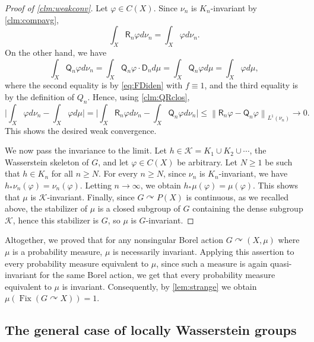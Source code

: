 \documentclass{amsart}
\numberwithin{equation}{subsection}
\theoremstyle{plain}
\theoremstyle{definition}
\theoremstyle{plain}
\begin{document}
\begin{proof}[Proof of \cref{clm:weakconv}]
Let \(\varphi\in C\left(X\right)\). Since \(\nu_{n}\) is \(K_{n}\)-invariant by \cref{clm:compavg},
\[\int_{X}\mathsf{R}_{n}\varphi d\nu_{n}=\int_{X}\varphi d\nu_{n}.\]
On the other hand, we have
\[\int_{X}\mathsf{Q}_{n}\varphi d\nu_{n}=\int_{X}\mathsf{Q}_{n}\varphi\cdot\mathsf{D}_{n}d\mu=\int_{X}\mathsf{Q}_{n}\varphi d\mu=\int_{X}\varphi d\mu,\]
where the second equality is by \eqref{eq:FDiden} with \(f\equiv 1\), and the third equality is by the definition of \(Q_{n}\). Hence, using \cref{clm:QRclos},
\[\Big|\int_{X}\varphi d\nu_{n}-\int_{X}\varphi d\mu\Big|=\Big|\int_{X}\mathsf{R}_{n}\varphi d\nu_{n}-\int_{X}\mathsf{Q}_{n}\varphi d\nu_{n}\Big|\leq\left\|\mathsf{R}_{n}\varphi-\mathsf{Q}_{n}\varphi\right\|_{L^{1}\left(\nu_{n}\right)}\to0.\]
This shows the desired weak convergence.

\smallskip

We now pass the invariance to the limit. Let \(h\in\mathcal{K}=K_{1}\cup K_{2}\cup\dotsm\), the Wasserstein skeleton of \(G\), and let \(\varphi\in C\left(X\right)\) be arbitrary. Let \(N\geq1\) be such that \(h\in K_{n}\) for all \(n\geq N\). For every \(n\geq N\), since \(\nu_{n}\) is \(K_{n}\)-invariant, we have \(h_{\ast}\nu_{n}\left(\varphi\right)=\nu_{n}\left(\varphi\right)\). Letting \(n\to\infty\), we obtain \(h_{\ast}\mu\left(\varphi\right)=\mu\left(\varphi\right)\). This shows that \(\mu\) is \(\mathcal{K}\)-invariant. Finally, since \(G\curvearrowright P\left(X\right)\) is continuous, as we recalled above, the stabilizer of \(\mu\) is a closed subgroup of \(G\) containing the dense subgroup \(\mathcal{K}\), hence this stabilizer is \(G\), so \(\mu\) is \(G\)-invariant.
\end{proof}

Altogether, we proved that for any nonsingular Borel action \(G\curvearrowright\left(X,\mu\right)\) where \(\mu\) is a probability measure, \(\mu\) is necessarily invariant. Applying this assertion to every probability measure equivalent to \(\mu\), since such a measure is again quasi-invariant for the same Borel action, we get that every probability measure equivalent to \(\mu\) is invariant. Consequently, by \cref{lem:strange} we obtain \(\mu\left(\operatorname{Fix}\left(G\curvearrowright X\right)\right)=1\).

\subsection{The general case of locally Wasserstein groups}
\end{document}
